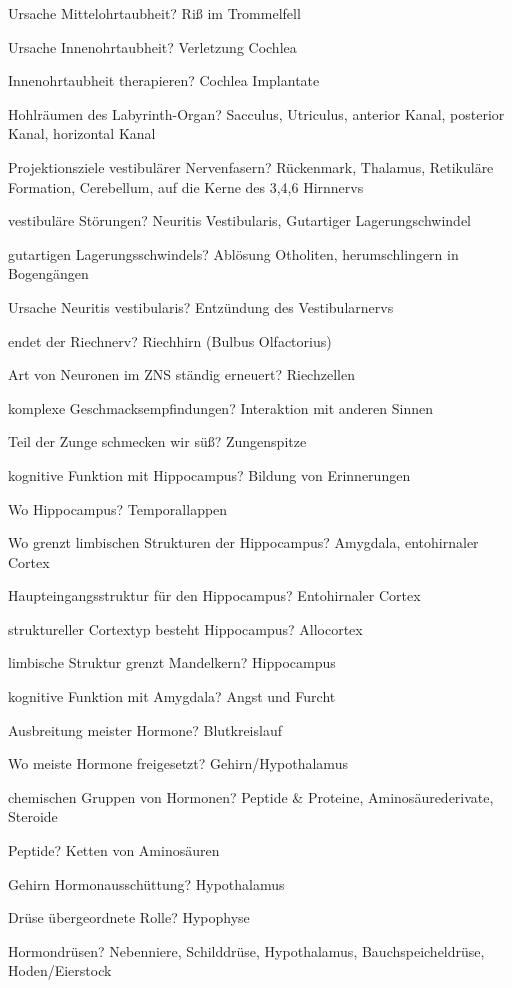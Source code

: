 \documentclass[a4paper]{article}
\begin{document}
\begin{multicols}{3}
  Ursache Mittelohrtaubheit? Riß im Trommelfell

  Ursache Innenohrtaubheit? Verletzung Cochlea

  Innenohrtaubheit therapieren? Cochlea Implantate

  Hohlräumen des Labyrinth-Organ? Sacculus, Utriculus, anterior Kanal, posterior Kanal, horizontal Kanal

  Projektionsziele vestibulärer Nervenfasern? Rückenmark, Thalamus, Retikuläre Formation, Cerebellum, auf die Kerne des 3,4,6 Hirnnervs

  vestibuläre Störungen? Neuritis Vestibularis, Gutartiger Lagerungschwindel

  gutartigen Lagerungsschwindels? Ablösung Otholiten, herumschlingern in Bogengängen

  Ursache Neuritis vestibularis? Entzündung des Vestibularnervs

  endet der Riechnerv? Riechhirn (Bulbus Olfactorius)

  Art von Neuronen im ZNS ständig erneuert? Riechzellen

  komplexe Geschmacksempfindungen? Interaktion mit anderen Sinnen

  Teil der Zunge schmecken wir süß? Zungenspitze

  kognitive Funktion mit Hippocampus? Bildung von Erinnerungen

  Wo Hippocampus? Temporallappen

  Wo grenzt limbischen Strukturen der Hippocampus? Amygdala, entohirnaler Cortex

  Haupteingangsstruktur für den Hippocampus? Entohirnaler Cortex

  struktureller Cortextyp besteht Hippocampus? Allocortex

  limbische Struktur grenzt Mandelkern? Hippocampus

  kognitive Funktion mit Amygdala? Angst und Furcht

  Ausbreitung meister Hormone? Blutkreislauf

  Wo meiste Hormone freigesetzt? Gehirn/Hypothalamus

  chemischen Gruppen von Hormonen? Peptide \& Proteine, Aminosäurederivate, Steroide

  Peptide? Ketten von Aminosäuren

  Gehirn Hormonausschüttung? Hypothalamus

  Drüse übergeordnete Rolle? Hypophyse

  Hormondrüsen? Nebenniere, Schilddrüse, Hypothalamus, Bauchspeicheldrüse, Hoden/Eierstock


\end{multicols}
\end{document}
